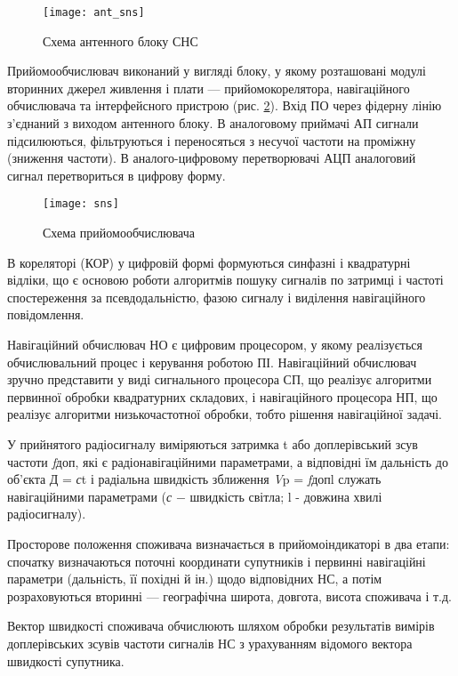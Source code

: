 \begin{figure}[here]
\centering
\texttt{[image: ant\_sns]}
\caption{Схема антенного блоку СНС}
\label{fig:ant_sns}
\end{figure} 


Прийомообчислювач виконаний у вигляді блоку, у якому розташовані модулі вторинних 
джерел живлення і плати --- прийомокорелятора, навігаційного обчислювача та інтерфейсного 
пристрою (рис. \ref{fig:sns}). Вхід ПО через фідерну лінію з'єднаний з виходом антенного блоку. 
В аналоговому приймачі АП сигнали підсилюються, фільтруються і переносяться з несучої 
частоти на проміжну (зниження частоти). В аналого-цифровому перетворювачі АЦП аналоговий 
сигнал перетвориться в цифрову форму.



\begin{figure}[here]
\centering
\texttt{[image: sns]}
\caption{Схема прийомообчислювача}
\label{fig:sns}
\end{figure} 



В кореляторі (КОР) у цифровій формі формуються синфазні  і квадратурні  відліки, що є 
основою роботи алгоритмів пошуку сигналів по затримці і частоті спостереження за псевдодальністю, 
фазою сигналу і виділення навігаційного повідомлення.

Навігаційний обчислювач НО є цифровим процесором, у якому реалізується обчислювальний процес 
і керування роботою ПІ. Навігаційний обчислювач зручно представити у виді сигнального процесора 
СП, що реалізує алгоритми первинної обробки квадратурних складових, і навігаційного процесора 
НП, що реалізує алгоритми низькочастотної обробки, тобто рішення навігаційної задачі.

У прийнятого радіосигналу виміряються затримка t або доплерівський зсув частоти \textit{f}доп, 
які є радіонавігаційними параметрами, а відповідні їм дальність до об'єкта\textit{ }Д = \textit{с}t  
і радіальна швидкість зближення \textit{V}p = \textit{f}допl   служать навігаційними параметрами 
(\textit{с }$-$ швидкість світла;  l - довжина хвилі радіосигналу).

Просторове положення споживача визначається в прийомоіндикаторі в два етапи: спочатку визначаються 
поточні координати супутників і первинні навігаційні параметри (дальність, її похідні й ін.) щодо 
відповідних НС, а потім розраховуються вторинні --- географічна широта, довгота, висота споживача і т.д.

Вектор швидкості споживача обчислюють шляхом обробки результатів вимірів доплерівських зсувів 
частоти сигналів НС з урахуванням відомого вектора швидкості супутника. 

